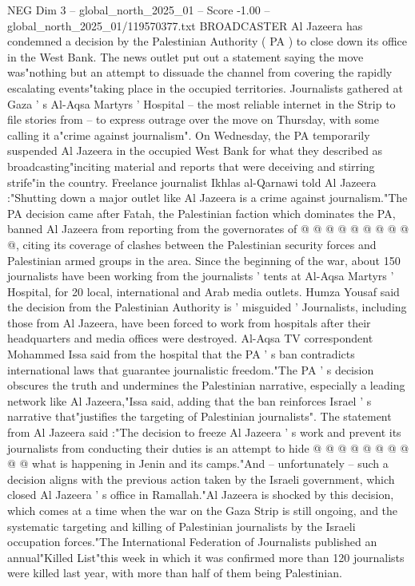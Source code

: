 \begin{textsample}{NEG Dim 3 – global\_north\_2025\_01 – Score -1.00 – global\_north\_2025\_01/119570377.txt}  \label{ex:f3_neg_199}
BROADCASTER Al Jazeera has condemned a decision by the Palestinian Authority ( PA ) to close down its office in the West Bank.
The news outlet put out a statement saying the move was"nothing but an attempt to dissuade the channel from covering the rapidly escalating events"taking place in the occupied territories.
Journalists gathered at Gaza ' s Al-Aqsa Martyrs ' Hospital -- the most reliable internet in the Strip to file stories from -- to express outrage over the move on Thursday, with some calling it a"crime against journalism".
On Wednesday, the PA temporarily suspended Al Jazeera in the occupied West Bank for what they described as broadcasting"inciting material and reports that were deceiving and stirring strife"in the country.
Freelance journalist Ikhlas al-Qarnawi told Al Jazeera :"Shutting down a major outlet like Al Jazeera is a crime against journalism."The PA decision came after Fatah, the Palestinian faction which dominates the PA, banned Al Jazeera from reporting from the governorates of @ @ @ @ @ @ @ @ @ @, citing its coverage of clashes between the Palestinian security forces and Palestinian armed groups in the area.
Since the beginning of the war, about 150 journalists have been working from the journalists ' tents at Al-Aqsa Martyrs ' Hospital, for 20 local, international and Arab media outlets.
Humza Yousaf said the decision from the Palestinian Authority is ' misguided ' Journalists, including those from Al Jazeera, have been forced to work from hospitals after their headquarters and media offices were destroyed.
Al-Aqsa TV correspondent Mohammed Issa said from the hospital that the PA ' s ban contradicts international laws that guarantee journalistic freedom."The PA ' s decision obscures the truth and undermines the Palestinian narrative, especially a leading network like Al Jazeera,"Issa said, adding that the ban reinforces Israel ' s narrative that"justifies the targeting of Palestinian journalists".
The statement from Al Jazeera said :"The decision to freeze Al Jazeera ' s work and prevent its journalists from conducting their duties is an attempt to hide @ @ @ @ @ @ @ @ @ @ what is happening in Jenin and its camps."And -- unfortunately -- such a decision aligns with the previous action taken by the Israeli government, which closed Al Jazeera ' s office in Ramallah."Al Jazeera is shocked by this decision, which comes at a time when the war on the Gaza Strip is still ongoing, and the systematic targeting and killing of Palestinian journalists by the Israeli occupation forces."The International Federation of Journalists published an annual"Killed List"this week in which it was confirmed more than 120 journalists were killed last year, with more than half of them being Palestinian.

\end{textsample}
